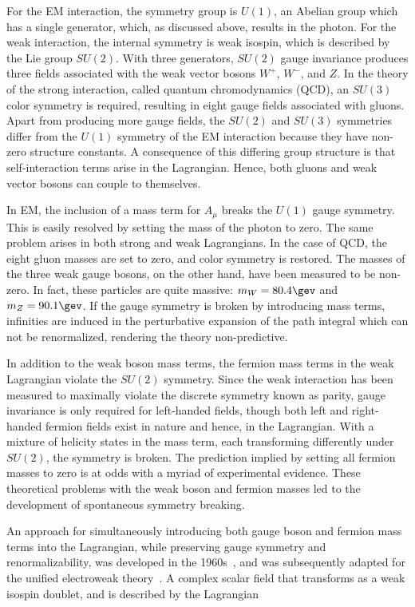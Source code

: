 For the EM interaction, the symmetry group is $U(1)$, an Abelian group which
has a single generator, which, as discussed above, results in the photon. For the weak
interaction, the internal symmetry is weak isospin, which is described by the Lie group
$SU(2)$. With three generators, $SU(2)$ gauge invariance produces three
fields associated with the weak vector bosons $W^+$, $W^-$, and
$Z$. In the theory of the strong interaction, called quantum chromodynamics
(QCD), an $SU(3)$ color symmetry is required, resulting in eight gauge
fields associated with gluons. Apart from producing more gauge fields,
the $SU(2)$ and $SU(3)$ symmetries differ from the $U(1)$ symmetry of
the EM interaction because they have non-zero
structure constants. A consequence of this differing group structure
is that self-interaction terms arise in the Lagrangian. Hence, both
gluons and weak vector bosons can couple to themselves. 

In EM, the inclusion of a mass term for $A_{\mu}$ breaks the $U(1)$
gauge symmetry. This is easily resolved by setting the mass of the
photon to zero. The same problem arises in both strong and weak
Lagrangians. In the case of QCD, the eight gluon masses are set to
zero, and color symmetry is restored. The masses of the three weak
gauge bosons, on the other hand, have been measured to be non-zero. In
fact, these particles are quite massive: $m_W = 80.4 \gev$ and $m_Z =
90.1 \gev$. If the gauge symmetry is broken by introducing mass
terms, infinities are induced in the perturbative
expansion of the path integral which can not be renormalized,
rendering the theory non-predictive. 

In addition to the weak
boson mass terms, the fermion mass terms
in the weak Lagrangian violate the $SU(2)$ symmetry. Since the weak
interaction has been measured to maximally violate the discrete
symmetry known as parity, gauge invariance is only required for
left-handed fields, though both left and right-handed fermion fields
exist in nature and hence, in the Lagrangian. With a mixture of
helicity states in the mass term, each transforming differently under
$SU(2)$, the symmetry is broken. The prediction implied by setting all
fermion masses to zero is at odds with a myriad of experimental
evidence. These theoretical problems with the weak boson and fermion
masses led to the development of spontaneous symmetry breaking. 

An approach for simultaneously introducing both gauge boson and
fermion mass terms
into the Lagrangian, while preserving gauge symmetry and
renormalizability, was developed in the 1960s~\cite{}, and was
subsequently adapted for the unified electroweak theory~\cite{}. A
complex scalar field that transforms as a weak isospin doublet, and is
described by the Lagrangian

